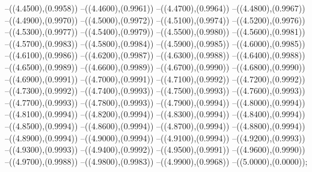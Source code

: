 {	--({\sx*(4.4500)},{\sy*(0.9958)})
	--({\sx*(4.4600)},{\sy*(0.9961)})
	--({\sx*(4.4700)},{\sy*(0.9964)})
	--({\sx*(4.4800)},{\sy*(0.9967)})
	--({\sx*(4.4900)},{\sy*(0.9970)})
	--({\sx*(4.5000)},{\sy*(0.9972)})
	--({\sx*(4.5100)},{\sy*(0.9974)})
	--({\sx*(4.5200)},{\sy*(0.9976)})
	--({\sx*(4.5300)},{\sy*(0.9977)})
	--({\sx*(4.5400)},{\sy*(0.9979)})
	--({\sx*(4.5500)},{\sy*(0.9980)})
	--({\sx*(4.5600)},{\sy*(0.9981)})
	--({\sx*(4.5700)},{\sy*(0.9983)})
	--({\sx*(4.5800)},{\sy*(0.9984)})
	--({\sx*(4.5900)},{\sy*(0.9985)})
	--({\sx*(4.6000)},{\sy*(0.9985)})
	--({\sx*(4.6100)},{\sy*(0.9986)})
	--({\sx*(4.6200)},{\sy*(0.9987)})
	--({\sx*(4.6300)},{\sy*(0.9988)})
	--({\sx*(4.6400)},{\sy*(0.9988)})
	--({\sx*(4.6500)},{\sy*(0.9989)})
	--({\sx*(4.6600)},{\sy*(0.9989)})
	--({\sx*(4.6700)},{\sy*(0.9990)})
	--({\sx*(4.6800)},{\sy*(0.9990)})
	--({\sx*(4.6900)},{\sy*(0.9991)})
	--({\sx*(4.7000)},{\sy*(0.9991)})
	--({\sx*(4.7100)},{\sy*(0.9992)})
	--({\sx*(4.7200)},{\sy*(0.9992)})
	--({\sx*(4.7300)},{\sy*(0.9992)})
	--({\sx*(4.7400)},{\sy*(0.9993)})
	--({\sx*(4.7500)},{\sy*(0.9993)})
	--({\sx*(4.7600)},{\sy*(0.9993)})
	--({\sx*(4.7700)},{\sy*(0.9993)})
	--({\sx*(4.7800)},{\sy*(0.9993)})
	--({\sx*(4.7900)},{\sy*(0.9994)})
	--({\sx*(4.8000)},{\sy*(0.9994)})
	--({\sx*(4.8100)},{\sy*(0.9994)})
	--({\sx*(4.8200)},{\sy*(0.9994)})
	--({\sx*(4.8300)},{\sy*(0.9994)})
	--({\sx*(4.8400)},{\sy*(0.9994)})
	--({\sx*(4.8500)},{\sy*(0.9994)})
	--({\sx*(4.8600)},{\sy*(0.9994)})
	--({\sx*(4.8700)},{\sy*(0.9994)})
	--({\sx*(4.8800)},{\sy*(0.9994)})
	--({\sx*(4.8900)},{\sy*(0.9994)})
	--({\sx*(4.9000)},{\sy*(0.9994)})
	--({\sx*(4.9100)},{\sy*(0.9994)})
	--({\sx*(4.9200)},{\sy*(0.9993)})
	--({\sx*(4.9300)},{\sy*(0.9993)})
	--({\sx*(4.9400)},{\sy*(0.9992)})
	--({\sx*(4.9500)},{\sy*(0.9991)})
	--({\sx*(4.9600)},{\sy*(0.9990)})
	--({\sx*(4.9700)},{\sy*(0.9988)})
	--({\sx*(4.9800)},{\sy*(0.9983)})
	--({\sx*(4.9900)},{\sy*(0.9968)})
	--({\sx*(5.0000)},{\sy*(0.0000)});
}
\def\xwertec{
\fill[color=red] (0.0000,0) circle[radius={0.07/\skala}];
\fill[color=white] (0.0000,0) circle[radius={0.05/\skala}];
\fill[color=red] (0.3349,0) circle[radius={0.07/\skala}];
\fill[color=white] (0.3349,0) circle[radius={0.05/\skala}];
\fill[color=red] (1.2500,0) circle[radius={0.07/\skala}];
\fill[color=white] (1.2500,0) circle[radius={0.05/\skala}];
\fill[color=red] (2.5000,0) circle[radius={0.07/\skala}];
\fill[color=white] (2.5000,0) circle[radius={0.05/\skala}];
\fill[color=red] (3.7500,0) circle[radius={0.07/\skala}];
\fill[color=white] (3.7500,0) circle[radius={0.05/\skala}];
\fill[color=red] (4.6651,0) circle[radius={0.07/\skala}];
\fill[color=white] (4.6651,0) circle[radius={0.05/\skala}];
\fill[color=red] (5.0000,0) circle[radius={0.07/\skala}];
\fill[color=white] (5.0000,0) circle[radius={0.05/\skala}];
}
